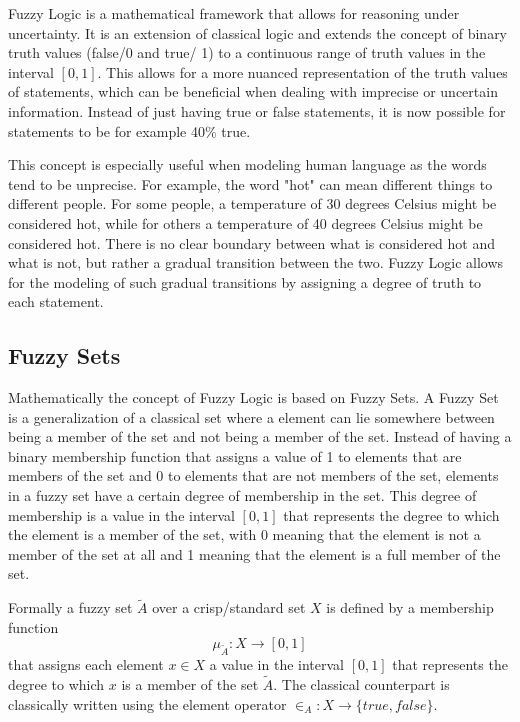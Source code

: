 Fuzzy Logic is a mathematical framework that allows for reasoning under uncertainty. It is an extension of classical logic and extends the concept of binary truth values (false/0 and true/ 1) to a continuous range of truth values in the interval $[0, 1]$. This allows for a more nuanced representation of the truth values of statements, which can be beneficial when dealing with imprecise or uncertain information. Instead of just having true or false statements, it is now possible for statements to be for example 40\% true.

This concept is especially useful when modeling human language as the words tend to be unprecise. For example, the word "hot" can mean different things to different people. For some people, a temperature of 30 degrees Celsius might be considered hot, while for others a temperature of 40 degrees Celsius might be considered hot. There is no clear boundary between what is considered hot and what is not, but rather a gradual transition between the two. Fuzzy Logic allows for the modeling of such gradual transitions by assigning a degree of truth to each statement.



\subsection{Fuzzy Sets}

Mathematically the concept of Fuzzy Logic is based on Fuzzy Sets. A Fuzzy Set is a generalization of a classical set where a element can lie somewhere between being a member of the set and not being a member of the set. Instead of having a binary membership function that assigns a value of 1 to elements that are members of the set and 0 to elements that are not members of the set, elements in a fuzzy set have a certain degree of membership in the set. This degree of membership is a value in the interval $[0, 1]$ that represents the degree to which the element is a member of the set, with 0 meaning that the element is not a member of the set at all and 1 meaning that the element is a full member of the set.


Formally a fuzzy set $\tilde{A}$ over a crisp/standard set $X$ is defined by a membership function
\begin{equation}
      \mu_{\tilde{A}}: X \rightarrow [0, 1]
\end{equation}
that assigns each element $x \in X$ a value in the interval $[0, 1]$ that represents the degree to which $x$ is a member of the set $\tilde{A}$. The classical counterpart is classically written using the element operator $\in_A : X \rightarrow \{true,false\}$.


